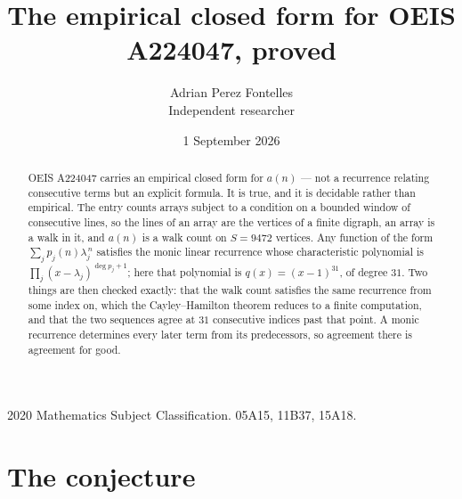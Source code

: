 \documentclass[11pt,a4paper]{article}
\title{The empirical closed form for OEIS A224047, proved}
\author{Adrian Perez Fontelles\\ \small Independent researcher}
\date{1 September 2026}
\theoremstyle{plain}
\theoremstyle{definition}
\begin{document}
\maketitle

\begin{abstract}
OEIS A224047 carries an empirical closed form for $a(n)$ --- not a recurrence relating
consecutive terms but an explicit formula. It is true, and it is decidable rather than
empirical. The entry counts arrays subject to a condition on a bounded window of consecutive lines, so the lines of an array are the
vertices of a finite digraph, an array is a walk in it, and $a(n)$ is a walk count on
$S=9472$ vertices. Any function of the form $\sum_j p_j(n)\lambda_j^{\,n}$ satisfies the
monic linear recurrence whose characteristic polynomial is
$\prod_j(x-\lambda_j)^{\deg p_j+1}$; here that polynomial is $q(x)=(x-1)^{31}$, of degree
$31$. Two things are then checked exactly: that the walk count satisfies the same
recurrence from some index on, which the Cayley--Hamilton theorem reduces to a finite
computation, and that the two sequences agree at $31$ consecutive indices past that
point. A monic recurrence determines every later term from its predecessors, so agreement
there is agreement for good.
\end{abstract}

\noindent\small 2020 Mathematics Subject Classification. 05A15, 11B37, 15A18.\normalsize

\section{The conjecture}
\end{document}
